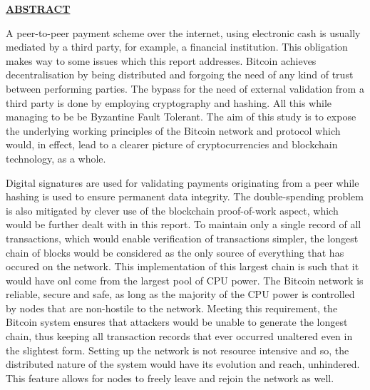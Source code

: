 \documentclass[12pt,a4paper]{report}
\begin{document}
\newpage
\begin{center}\underline{ \Large \textbf{ABSTRACT}}\end{center}
\vspace{5mm}
 \begin{flushleft}
 A peer-to-peer payment scheme over the internet, using electronic cash is usually mediated by a third party, for example, a financial institution. This obligation makes way to some issues which this report addresses. Bitcoin achieves decentralisation by being distributed and forgoing the need of any kind of trust between performing parties. The bypass for the need of external validation from a third party is done by employing cryptography and hashing. All this while managing to be be Byzantine Fault Tolerant. The aim of this study is to expose the underlying working principles of the Bitcoin  network and protocol which would, in effect, lead to a clearer picture of cryptocurrencies and blockchain technology, as a whole.
 \vspace{5mm}
  
 Digital signatures are used for validating payments originating from a peer while hashing is used to ensure permanent data integrity. The double-spending problem is also mitigated by clever use of the blockchain proof-of-work aspect, which would be further dealt with in this report. To maintain only a single record of all transactions, which would enable verification of transactions simpler, the longest chain of blocks would be considered as the only source of everything that has occured on the network. This implementation of this largest chain is such that it would have onl come from the largest pool of CPU power.
  \vspace{5mm}
 The Bitcoin network is reliable, secure and safe, as long as the majority of the CPU power is controlled by nodes that are non-hostile to the network. Meeting this requirement, the Bitcoin system ensures that attackers would be unable to generate the longest chain, thus keeping all transaction records that ever occurred unaltered even in the slightest form. Setting up the network is not resource intensive and so, the distributed nature of the system would have its evolution and reach, unhindered. This feature allows for nodes to freely leave and rejoin the network as well.
 \vspace{10mm} 
 


\end{flushleft}
\end{document}
